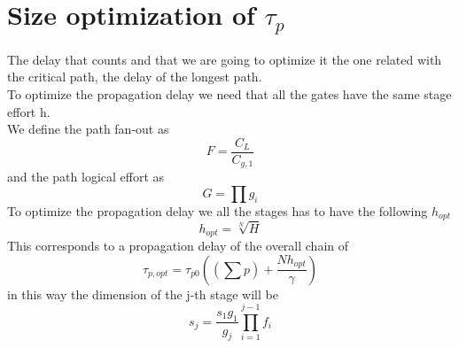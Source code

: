 \section{Size optimization of $\tau_p$}
The delay that counts and that we are going to optimize it the one related with the critical path, the delay of the longest path.\\
To optimize the propagation delay we need that all the gates have the same stage effort h.\\
\vspace{5mm}
We define the path fan-out as 
\begin{equation}
F=\frac{C_L}{C_{g,1}}
\end{equation}
and the path logical effort as 
\begin{equation}
G=\prod g_i
\end{equation}
To optimize the propagation delay we all the stages has to have the following $h_{opt}$
\begin{equation}
h_{opt}=\sqrt[N]{H}
\end{equation}
This corresponds to a propagation delay of the overall chain of 
\begin{equation}
\tau_{p,opt}=\tau_{p0}\left( (\sum p)+\frac{N h_{opt}}{\gamma} \right)
\end{equation}
in this way the dimension of the j-th stage will be 
\begin{equation}
s_j=\frac{s_1g_1}{g_j}\prod_{i=1}^{j-1}f_i
\end{equation}


























